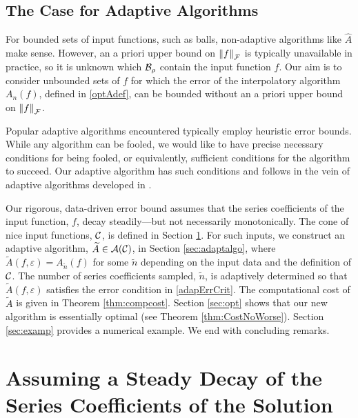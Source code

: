\documentclass[graybox,footinfo]{svmult}
\newcommand{\DHJRnorm}[2][{}]{\ensuremath{\left \lVert #2 \right \rVert}_{#1}}
\begin{document}
\subsection{The Case for Adaptive Algorithms}
For bounded sets of input functions, such as balls, non-adaptive algorithms like $\widehat{A}$ make sense.  However, an a priori upper bound on $\DHJRnorm[\calF]{f}$ is typically unavailable in practice, so it is unknown which ${\mathcal{B}}_{\rho}$ contain the input function $f$.  Our aim is to consider unbounded sets of $f$ for which the error of the interpolatory algorithm $A_n(f)$, defined in \eqref{optAdef}, can be bounded without an a priori upper bound on $\DHJRnorm[\calF]{f}$.


Popular adaptive algorithms encountered typically employ heuristic error bounds.  While any algorithm can be fooled, we would like to have precise necessary conditions for being fooled, or equivalently, sufficient conditions for the algorithm to succeed.  Our adaptive algorithm has such conditions and follows in the vein of adaptive algorithms developed in \cite{HicEtal14a, HIcEtal14b, HicJim16a, JimHic16a, HicEtal17a}.

Our rigorous, data-driven error bound assumes that the series coefficients of the input function, $f$, decay steadily---but not necessarily monotonically.  The cone of nice input functions, ${\mathcal{C}}$, is defined in Section \ref{sec:cone}.  For such inputs, we construct an adaptive algorithm, $\widetilde{A} \in {\mathcal{A}}({\mathcal{C}})$, in Section \ref{sec:adaptalgo},  where $\widetilde{A}(f,\varepsilon) = A_{\widetilde{n}}(f)$ for some $\widetilde{n}$ depending on the input data and the definition of ${\mathcal{C}}$.  The number of series coefficients sampled, $\widetilde{n}$, is adaptively determined so that $\widetilde{A}(f,\varepsilon)$ satisfies the error condition in \eqref{adapErrCrit}.  The computational cost of $\widetilde{A}$ is given in  Theorem \ref{thm:compcost}.  Section \ref{sec:opt} shows that our new algorithm is essentially optimal (see Theorem \ref{thm:CostNoWorse}).  Section \ref{sec:examp} provides a numerical example.  We end with concluding remarks. 




\section{Assuming a Steady Decay of the Series Coefficients of the Solution} \label{sec:cone}
\end{document}
